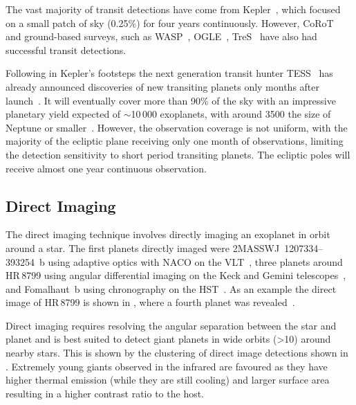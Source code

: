 The vast majority of transit detections have come from Kepler~\citep{borucki_characteristics_2011}, which focused on a small patch of sky (0.25\%) for four years continuously.
However, {CoRoT}~\citep{barge_transiting_2008} and ground-based surveys, such as WASP~\citep{pollacco_wasp_2006}, OGLE~\citep{udalski_optical_2002}, TreS~\citep{alonso_tres1_2004} have also had successful transit detections.

Following in Kepler's footsteps the next generation transit hunter {TESS}~\citep{ricker_transiting_2015} has already announced discoveries of new transiting planets only months after launch~\citep{vanderspek_tess_2018, gandolfi_tess_2018, huang_tess_2018}.
It will eventually cover more than 90\% of the sky with an impressive planetary yield expected of $\sim$10\,000 exoplanets, with around 3500 the size of Neptune or smaller~\citep{barclay_revised_2018, huang_expected_2018}.
However, the observation coverage is not uniform, with the majority of the ecliptic plane receiving only one month of observations, limiting the detection sensitivity to short period transiting planets.
The ecliptic poles will receive almost one year continuous observation.


\subsection{Direct Imaging}
\label{sub:direct_detection}
The direct imaging technique involves directly imaging an exoplanet in orbit around a star.
The first planets directly imaged were {2MASSWJ~1207334--393254~b} using adaptive optics with NACO on the VLT~\citep{chauvin_giant_2004}, three planets around HR\,8799 using angular differential imaging on the Keck and Gemini telescopes~\citep{marois_direct_2008}, and {Fomalhaut~b} using chronography on the HST~\citep{kalas_optical_2008}.
As an example the direct image of {HR\,8799} is shown in , where a fourth planet was revealed~\citep{marois_images_2010}.

Direct imaging requires resolving the angular separation between the star and planet and is best suited to detect giant planets in wide orbits (>10\AU{}) around nearby stars.
This is shown by the clustering of direct image detections shown in .
Extremely young giants observed in the infrared are favoured as they have higher thermal emission (while they are still cooling) and larger surface area resulting in a higher contrast ratio to the host.


